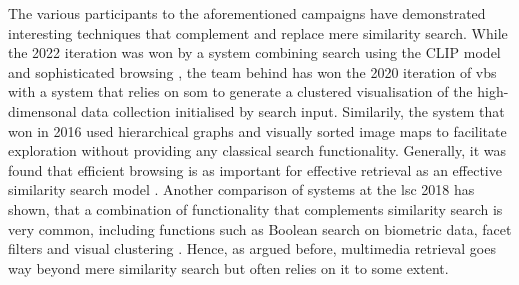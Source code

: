 The various participants to the aforementioned campaigns have demonstrated interesting techniques that complement and replace mere similarity search. While the 2022 iteration was won by a system combining search using the CLIP model \cite{Radford:2021Learning} and sophisticated browsing \cite{Hezel:2022Efficient}, the team behind \cite{Kratochvil:2020SOM} has won the 2020 iteration of \acrshort{vbs} with a system that relies on \acrfull{som} \cite{Kohonen:1990Self} to generate a clustered visualisation of the high-dimensonal data collection initialised by search input. Similarily, the system that won in 2016 used \cite{Barthel:2016Navigating} hierarchical graphs and visually sorted image maps to facilitate exploration without providing any classical search functionality. Generally, it was found that efficient browsing is as important for effective retrieval as an effective similarity search model \cite{Lokovc:2019Interactive}. Another comparison of systems at the \acrshort{lsc} 2018 has shown, that a combination of functionality that complements similarity search is very common, including functions such as Boolean search on biometric data, facet filters and visual clustering \cite{Gurrin:2019Invited}. Hence, as argued before, multimedia retrieval goes way beyond mere similarity search but often relies on it to some extent.